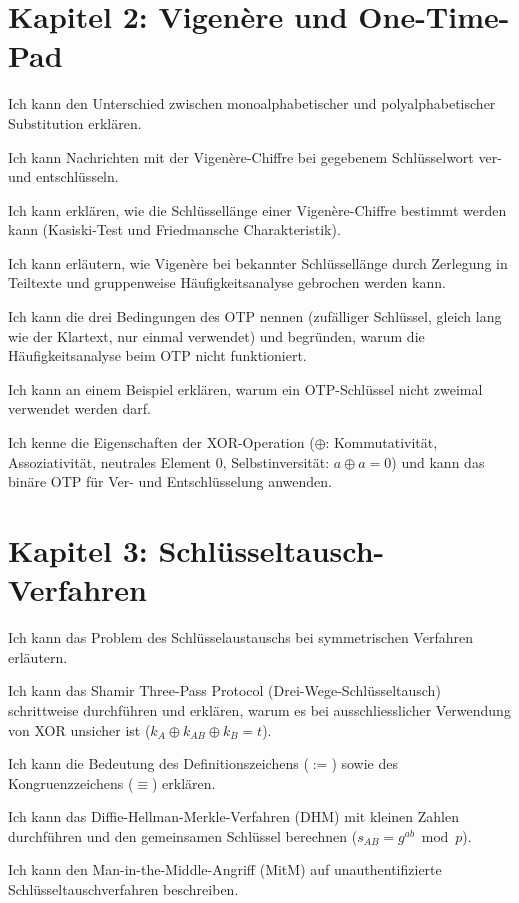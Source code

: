 \section*{Kapitel 2: Vigenère und One-Time-Pad}
\begin{todolist}
  \item Ich kann den Unterschied zwischen monoalphabetischer und polyalphabetischer Substitution erklären.
  \item Ich kann Nachrichten mit der Vigenère-Chiffre bei gegebenem Schlüsselwort ver- und entschlüsseln.
  \item Ich kann erklären, wie die Schlüssellänge einer Vigenère-Chiffre bestimmt werden kann (Kasiski-Test und Friedmansche Charakteristik).
  \item Ich kann erläutern, wie Vigenère bei bekannter Schlüssellänge durch Zerlegung in Teiltexte und gruppenweise Häufigkeitsanalyse gebrochen werden kann.
  \item Ich kann die drei Bedingungen des \gls{OTP} nennen (zufälliger Schlüssel, gleich lang wie der Klartext, nur einmal verwendet) und begründen, warum die Häufigkeitsanalyse beim \gls{OTP} nicht funktioniert.
  \item Ich kann an einem Beispiel erklären, warum ein \gls{OTP}-Schlüssel nicht zweimal verwendet werden darf.
  \item Ich kenne die Eigenschaften der \gls{XOR}-Operation ($\oplus$: Kommutativität, Assoziativität, neutrales Element 0, Selbstinversität: $a \oplus a = 0$) und kann das binäre \gls{OTP} für Ver- und Entschlüsselung anwenden.
\end{todolist}

\section*{Kapitel 3: Schlüsseltausch-Verfahren}
\begin{todolist}
  \item Ich kann das Problem des Schlüsselaustauschs bei symmetrischen Verfahren erläutern.
  \item Ich kann das Shamir Three-Pass Protocol (Drei-Wege-Schlüsseltausch) schrittweise durchführen und erklären, warum es bei ausschliesslicher Verwendung von \gls{XOR} unsicher ist ($k_A \oplus k_{AB} \oplus k_B = t$).
  \item Ich kann die Bedeutung des Definitionszeichens ($:=$) sowie des Kongruenzzeichens ($\equiv$) erklären.
  \item Ich kann das Diffie-Hellman-Merkle-Verfahren (\gls{DHM}) mit kleinen Zahlen durchführen und den gemeinsamen Schlüssel berechnen ($s_{AB} = g^{ab} \bmod p$).
  \item Ich kann den Man-in-the-Middle-Angriff (\acrshort{MitM}) auf unauthentifizierte Schlüsseltauschverfahren beschreiben.
\end{todolist}

